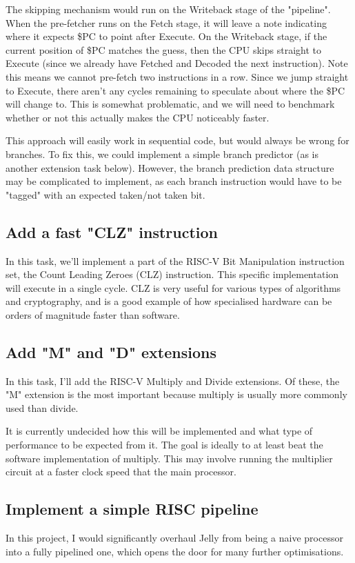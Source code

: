 \documentclass{article}
\begin{document}
The skipping mechanism would run on the Writeback stage of the "pipeline". When the pre-fetcher runs on the
Fetch stage, it will leave a note indicating where it expects \$PC to point after Execute. On the Writeback
stage, if the current position of \$PC matches the guess, then the CPU skips straight to Execute (since we
already have Fetched and Decoded the next instruction). Note this means we cannot pre-fetch two instructions
in a row. Since we jump straight to Execute, there aren't any cycles remaining to speculate about where the
\$PC will change to. This is somewhat problematic, and we will need to benchmark whether or not this actually
makes the CPU noticeably faster.

This approach will easily work in sequential code, but would always be wrong for branches. To fix this, we
could implement a simple branch predictor (as is another extension task below). However, the branch
prediction data structure may be complicated to implement, as each branch instruction would have to be
"tagged" with an expected taken/not taken bit.

\subsection{Add a fast "CLZ" instruction}
In this task, we'll implement a part of the RISC-V Bit Manipulation instruction set, the Count Leading Zeroes
(CLZ) instruction. This specific implementation will execute in a single cycle. CLZ is very useful for
various types of algorithms and cryptography, and is a good example of how specialised hardware can be orders
of magnitude faster than software.

\subsection{Add "M" and "D" extensions}
In this task, I'll add the RISC-V Multiply and Divide extensions. Of these, the "M" extension is the most
important because multiply is usually more commonly used than divide.

It is currently undecided how this will be implemented and what type of performance to be expected from it.
The goal is ideally to at least beat the software implementation of multiply. This may involve running the
multiplier circuit at a faster clock speed that the main processor.

\subsection{Implement a simple RISC pipeline}
In this project, I would significantly overhaul Jelly from being a naive processor into a fully pipelined
one, which opens the door for many further optimisations.
\end{document}
